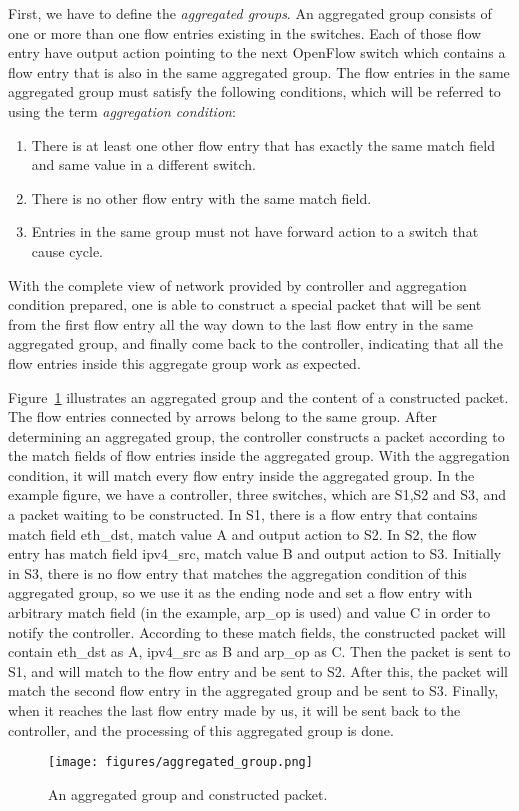 First, we have to define the \textit{aggregated groups}. An aggregated group consists of one or more than one flow entries existing in the switches. Each of those flow entry have output action pointing to the next OpenFlow switch which contains a flow entry that is also in the same aggregated group. The flow entries in the same aggregated group must satisfy the following conditions, which will be referred to using the term \textit{aggregation condition}:
\begin{enumerate}
\item
There is at least one other flow entry that has exactly the same match field and same value in a different switch.
\item
There is no other flow entry with the same match field.
\item
Entries in the same group must not have forward action to a switch that cause cycle.
\end{enumerate}

With the complete view of network provided by controller and aggregation condition prepared, one is able to construct a special packet that will be sent from the first flow entry all the way down to the last flow entry in the same aggregated group, and finally come back to the controller, indicating that all the flow entries inside this aggregate group work as expected. 

Figure~\ref{aggregated_group} illustrates an aggregated group and the content of a constructed packet. The flow entries connected by arrows belong to the same group. After determining an aggregated group, the controller constructs a packet according to the match fields of flow entries inside the aggregated group. With the aggregation condition, it will match every flow entry inside the aggregated group. In the example figure, we have a controller, three switches, which are S1,S2 and S3, and a packet waiting to be constructed. In S1, there is a flow entry that contains match field eth\_dst, match value A and output action to S2. In S2, the flow entry has match field ipv4\_src, match value B and output action to S3. Initially in S3, there is no flow entry that matches the aggregation condition of this aggregated group, so we use it as the ending node and set a flow entry with arbitrary match field (in the example, arp\_op is used) and value C in order to notify the controller. According to these match fields, the constructed packet will contain eth\_dst as A, ipv4\_src as B and arp\_op as C. Then the packet is sent to S1, and will match to the flow entry and be sent to S2. After this, the packet will match the second flow entry in the aggregated group and be sent to S3. Finally, when it reaches the last flow entry made by us, it will be sent back to the controller, and the processing of this aggregated group is done. 
\begin{figure}[H]
\begin{center} 
\texttt{[image: figures/aggregated\_group.png]}
\end{center}
\caption{An aggregated group and constructed packet.}
\label{aggregated_group}
\end{figure}

